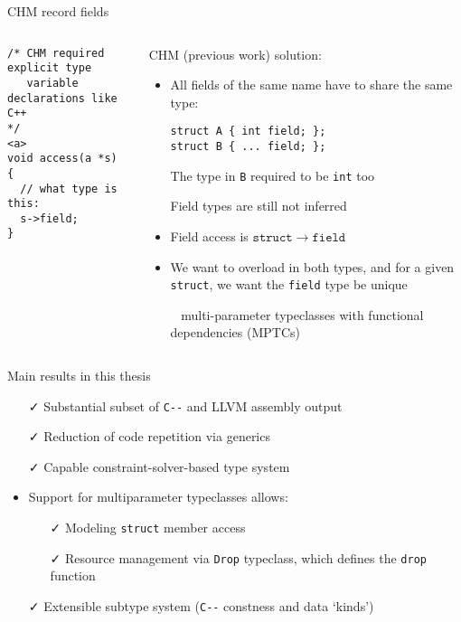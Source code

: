 \documentclass[aspectratio=169]{beamer}
\newcommand{\li}[1]{\lstinline{#1}}
\def\cmm{\texttt{C-\relax-}}
\begin{document}
\begin{frame}[fragile]{CHM record fields}
\begin{columns}
  \begin{column}{.5\linewidth}
    \begin{lstlisting}[basicstyle=\scriptsize\ttfamily]
/* CHM required explicit type
   variable declarations like C++
*/
<a>
void access(a *s) {
  // what type is this:
  s->field;
}
    \end{lstlisting}
  \end{column}%
  \begin{column}{.5\linewidth}
    CHM (previous work) solution:
    \begin{itemize}\small
      \item All fields of the same name have to share the same type:

      
      \lstinline|struct A { int field; };|\\
      \lstinline|struct B { ... field; };|

      The type in \li{B} required to be \li{int} too

      \item[\color{red}\faTimes] Field types are still not inferred
      \item Field access is $\mathtt{struct} \to \mathtt{field}$
      \item We want to overload in both types, and for a given \li{struct}, we want the \li{field} type be unique
      
      \faArrowRight~ multi-parameter typeclasses with functional dependencies (MPTCs)
    \end{itemize}
  \end{column}
\end{columns}
\end{frame}

\begin{frame}{Main results in this thesis}
  \begin{itemize}
  \item[\color{green!80!black}\faCheck] Substantial subset of \cmm{} and LLVM assembly output
  \item[\color{green!80!black}\faCheck] Reduction of code repetition via generics
  \item[\color{green!80!black}\faCheck] Capable constraint-solver-based type system
  \item Support for multiparameter typeclasses allows:
    \begin{itemize}
      \item[\color{green!80!black}\faCheck] Modeling \li{struct} member access
      \item[\color{green!80!black}\faCheck] Resource management via \li{Drop} typeclass, which defines the \li{drop} function
    \end{itemize}
  \item[\color{green!80!black}\faCheck] Extensible subtype system (\cmm{} constness and data `kinds')
  \end{itemize}
\end{frame}
\end{document}
